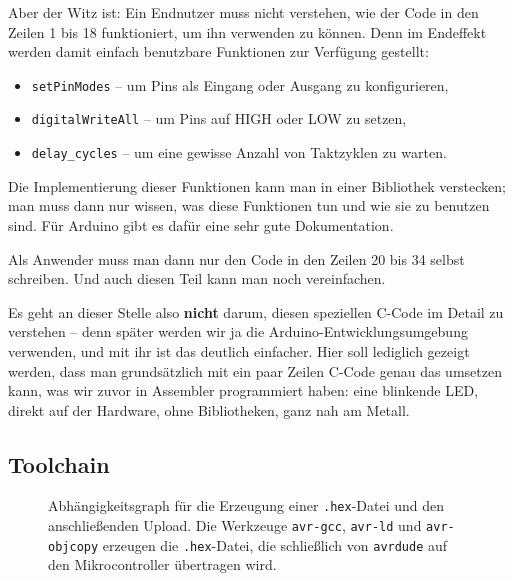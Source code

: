 \documentclass[a4paper,12pt]{article}
\begin{document}
Aber der Witz ist: Ein Endnutzer muss nicht verstehen, wie der Code in den
Zeilen 1 bis 18 funktioniert, um ihn verwenden zu können. Denn im Endeffekt
werden damit einfach benutzbare Funktionen zur Verfügung gestellt:
\begin{itemize}
  \item
      \texttt{setPinModes} – um Pins als Eingang oder Ausgang zu konfigurieren,
  \item
      \texttt{digitalWriteAll} – um Pins auf HIGH oder LOW zu setzen,
  \item
      \texttt{delay\_cycles} – um eine gewisse Anzahl von Taktzyklen zu warten.
\end{itemize}

\noindent
Die Implementierung dieser Funktionen kann man in einer Bibliothek verstecken;
man muss dann nur wissen, was diese Funktionen tun und wie sie zu benutzen
sind. Für Arduino gibt es dafür eine sehr gute Dokumentation.

Als Anwender muss man dann nur den Code in den Zeilen 20 bis 34 selbst
schreiben. Und auch diesen Teil kann man noch vereinfachen.

Es geht an dieser Stelle also \textbf{nicht} darum, diesen speziellen C-Code im
Detail zu verstehen – denn später werden wir ja die
Arduino-Entwicklungsumgebung verwenden, und mit ihr ist das deutlich einfacher.
Hier soll lediglich gezeigt werden, dass man grundsätzlich mit ein paar Zeilen
C-Code genau das umsetzen kann, was wir zuvor in Assembler programmiert haben:
eine blinkende LED, direkt auf der Hardware, ohne Bibliotheken, ganz nah am
Metall.



\subsection{Toolchain}
\begin{figure}[ht]
\centering
{}
\caption{
    Abhängigkeitsgraph für die Erzeugung einer \texttt{.hex}-Datei und den
    anschließenden Upload. Die Werkzeuge \texttt{avr-gcc}, \texttt{avr-ld} und
    \texttt{avr-objcopy} erzeugen die \texttt{.hex}-Datei, die schließlich von
    \texttt{avrdude} auf den Mikrocontroller übertragen wird.
}
\label{fig:makegraph_c}
\end{figure}
\end{document}
